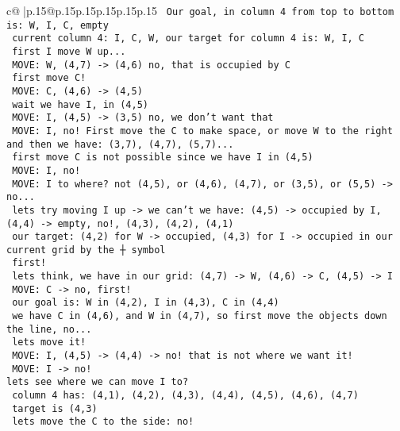 \documentclass{article}
\begin{document}
{\begin{supertabular}{c@{$\;$}|p{.15\linewidth}@{}p{.15\linewidth}p{.15\linewidth}p{.15\linewidth}p{.15\linewidth}p{.15\linewidth}}
{{{\texttt{ Our goal, in column 4 from top to bottom is: W, I, C, empty} \\
\texttt{ current column 4: I, C, W, our target for column 4 is: W, I, C} \\
\texttt{ first I move W up...} \\
\texttt{ MOVE: W, (4,7) {-}> (4,6) no, that is occupied by C} \\
\texttt{ first move C!} \\
\texttt{ MOVE: C, (4,6) {-}> (4,5) } \\
\texttt{ wait we have I, in (4,5)} \\
\texttt{ MOVE: I, (4,5) {-}> (3,5) no, we don't want that} \\
\texttt{ MOVE: I, no! First move the C to make space, or move W to the right and then we have: (3,7), (4,7), (5,7)...} \\
\texttt{ first move C is not possible since we have I in (4,5) } \\
\texttt{ MOVE: I, no! } \\
\texttt{ MOVE: I to where? not (4,5), or (4,6), (4,7), or (3,5), or (5,5) {-}> no...} \\
\texttt{ lets try moving I up {-}> we can't we have: (4,5) {-}> occupied by I, (4,4) {-}> empty, no!, (4,3), (4,2), (4,1) } \\
\texttt{ our target: (4,2) for W {-}> occupied, (4,3) for I {-}> occupied in our current grid by the ┼ symbol} \\
\texttt{ first!} \\
\texttt{ lets think, we have in our grid: (4,7) {-}> W, (4,6) {-}> C, (4,5) {-}> I } \\
\texttt{ MOVE: C {-}> no, first!} \\
\texttt{ our goal is: W in (4,2), I in (4,3), C in (4,4)} \\
\texttt{ we have C in (4,6), and W in (4,7), so first move the objects down the line, no...} \\
\texttt{ lets move it!} \\
\texttt{ MOVE: I, (4,5) {-}> (4,4) {-}> no! that is not where we want it!} \\
\texttt{ MOVE: I {-}> no! } \\
\texttt{lets see where we can move I to? } \\
\texttt{ column 4 has: (4,1), (4,2), (4,3), (4,4), (4,5), (4,6), (4,7) } \\
\texttt{ target is (4,3) } \\
\texttt{ lets move the C to the side: no!} \\
}}}
\end{supertabular}}
\end{document}
